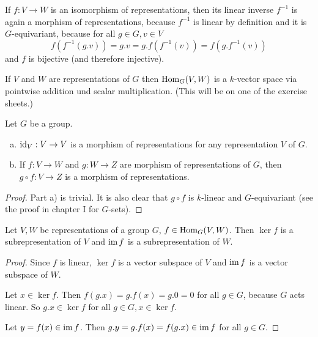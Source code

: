 \begin{rem}
 If $f : V \to W$ is an isomorphism of representations, then its linear inverse $f^{-1}$ is again a morphism of representations, because $f^{-1}$ is linear by definition and it is $G$-equivariant, because for all $g \in G, v \in V$
 \[
  f\left(f^{-1}(g.v)\right) = g.v = g.f\left(f^{-1}(v)\right) = f\left(g.f^{-1}(v)\right)
 \]
 and $f$ is bijective (and therefore injective).
\end{rem}


\begin{rem}
 If $V$ and $W$ are representations of $G$ then $\operatorname{Hom}_G(V,W)$ is a $k$-vector space via pointwise addition und scalar multiplication. (This will be on one of the exercise sheets.)
\end{rem}


\begin{lem}\label{lem: composition of morphisms of representations}
 Let $G$ be a group.
 \begin{enumerate}[a)]
  \item
  $\operatorname{id}_V : V \to V$ is a morphism of representations for any representation $V$ of $G$.
  \item
  If $f : V \to W$  and $g : W \to Z$ are morphism of representations of $G$, then $g \circ f : V \to Z$ is a morphism of representations.
 \end{enumerate}
\end{lem}
\begin{proof}
 Part a) is trivial. It is also clear that $g \circ f$ is $k$-linear and $G$-equivariant (see the proof in chapter I for $G$-sets).
\end{proof}


\begin{lem}\label{lem: ker and im subrepresentations}
 Let $V,W$ be representations of a group $G$, $f \in \operatorname{Hom}_G(V,W)$. Then $\ker f$ is a subrepresentation of $V$ and $\operatorname{im} f$ is a subrepresentation of $W$.
\end{lem}
\begin{proof}
 Since $f$ is linear, $\ker f$ is a vector subspace of $V$ and $\operatorname{im} f$ is a vector subspace of $W$.
 
 Let $x \in \ker f$. Then $f(g.x) = g.f(x) = g.0 = 0$ for all $g \in G$, because $G$ acts linear. So $g.x \in \ker f$ for all $g \in G, x \in \ker f$.
 
 Let $y = f(x) \in \operatorname{im} f$. Then $g.y = g.f(x) = f(g.x) \in \operatorname{im} f$ for all $g \in G$.
\end{proof}


